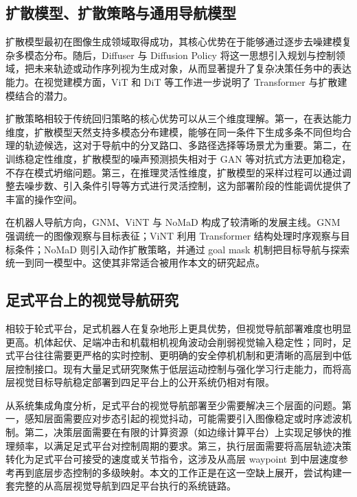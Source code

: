 \subsection{扩散模型、扩散策略与通用导航模型}

扩散模型最初在图像生成领域取得成功，其核心优势在于能够通过逐步去噪建模复杂多模态分布\cite{ddpm2020,ddim2020}。随后，Diffuser 与 Diffusion Policy 将这一思想引入规划与控制领域，把未来轨迹或动作序列视为生成对象，从而显著提升了复杂决策任务中的表达能力\cite{diffuser2022,diffusionpolicy2023}。在视觉建模方面，ViT 和 DiT 等工作进一步说明了 Transformer 与扩散建模结合的潜力\cite{vit2020,dit2022}。

扩散策略相较于传统回归策略的核心优势可以从三个维度理解。第一，在表达能力维度，扩散模型天然支持多模态分布建模，能够在同一条件下生成多条不同但均合理的轨迹候选，这对于导航中的分叉路口、多路径选择等场景尤为重要。第二，在训练稳定性维度，扩散模型的噪声预测损失相对于 GAN 等对抗式方法更加稳定，不存在模式坍缩问题。第三，在推理灵活性维度，扩散模型的采样过程可以通过调整去噪步数、引入条件引导等方式进行灵活控制，这为部署阶段的性能调优提供了丰富的操作空间。

在机器人导航方向，GNM、ViNT 与 NoMaD 构成了较清晰的发展主线。GNM 强调统一的图像观察与目标表征\cite{gnm2022}；ViNT 利用 Transformer 结构处理时序观察与目标条件\cite{vint2023}；NoMaD 则引入动作扩散策略，并通过 goal mask 机制把目标导航与探索统一到同一模型中\cite{nomad2023}。这使其非常适合被用作本文的研究起点。

\subsection{足式平台上的视觉导航研究}

相较于轮式平台，足式机器人在复杂地形上更具优势，但视觉导航部署难度也明显更高。机体起伏、足端冲击和机载相机视角波动会削弱视觉输入稳定性；同时，足式平台往往需要更严格的实时控制、更明确的安全停机机制和更清晰的高层到中低层控制接口\cite{hwangbo2019anymal,lee2020learning}。现有大量足式研究聚焦于低层运动控制与强化学习行走能力，而将高层视觉目标导航稳定部署到四足平台上的公开系统仍相对有限。

从系统集成角度分析，足式平台的视觉导航部署至少需要解决三个层面的问题。第一，感知层面需要应对步态引起的视觉抖动，可能需要引入图像稳定或时序滤波机制。第二，决策层面需要在有限的计算资源（如边缘计算平台）上实现足够快的推理频率，以满足足式平台对控制周期的要求。第三，执行层面需要将高层轨迹决策转化为足式平台可接受的速度或关节指令，这涉及从高层 waypoint 到中层速度参考再到底层步态控制的多级映射。本文的工作正是在这一空缺上展开，尝试构建一套完整的从高层视觉导航到四足平台执行的系统链路。

